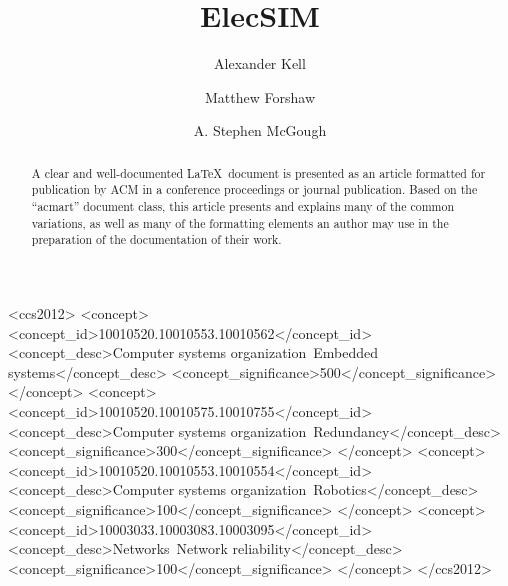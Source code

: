 \documentclass[sigconf]{acmart}
\begin{document}
	
	\title{ElecSIM}
	
	
	\author{Alexander Kell}
	
	\author{Matthew Forshaw}
	
	\author{A. Stephen McGough}
	
	
	\renewcommand{\shortauthors}{Trovato and Tobin, et al.}
	
	\begin{abstract}
		A clear and well-documented \LaTeX\ document is presented as an article formatted for publication by ACM in 
		a conference proceedings or journal publication. Based on the ``acmart'' document class, this article presents
		and explains many of the common variations, as well as many of the formatting elements
		an author may use in the preparation of the documentation of their work.
	\end{abstract}
	
	\begin{CCSXML}
		<ccs2012>
		<concept>
		<concept_id>10010520.10010553.10010562</concept_id>
		<concept_desc>Computer systems organization~Embedded systems</concept_desc>
		<concept_significance>500</concept_significance>
		</concept>
		<concept>
		<concept_id>10010520.10010575.10010755</concept_id>
		<concept_desc>Computer systems organization~Redundancy</concept_desc>
		<concept_significance>300</concept_significance>
		</concept>
		<concept>
		<concept_id>10010520.10010553.10010554</concept_id>
		<concept_desc>Computer systems organization~Robotics</concept_desc>
		<concept_significance>100</concept_significance>
		</concept>
		<concept>
		<concept_id>10003033.10003083.10003095</concept_id>
		<concept_desc>Networks~Network reliability</concept_desc>
		<concept_significance>100</concept_significance>
		</concept>
		</ccs2012>
	\end{CCSXML}
	
\end{document}
